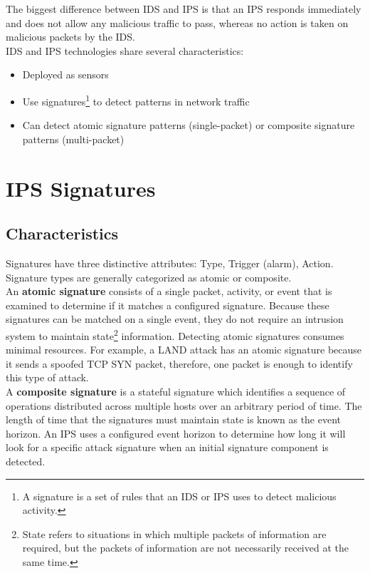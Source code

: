 The biggest difference between IDS and IPS is that an IPS responds immediately and does not allow any malicious traffic to pass, whereas no action is taken on malicious packets by the IDS.\\

IDS and IPS technologies share several characteristics:

\begin{itemize}
\item Deployed as sensors
\item Use signatures\footnote{A signature is a set of rules that an IDS or IPS uses to detect malicious activity.} to detect patterns in network traffic
\item Can detect atomic signature patterns (single-packet) or composite signature patterns (multi-packet)
\end{itemize}

\section{IPS Signatures}

\subsection{Characteristics}

Signatures have three distinctive attributes: Type, Trigger (alarm), Action. Signature types are generally categorized as atomic or composite.\\

An \textbf{atomic signature} consists of a single packet, activity, or event that is examined to determine if it matches a configured signature. Because these signatures can be matched on a single event, they do not require an intrusion system to maintain state\footnote{State refers to situations in which multiple packets of information are required, but the packets of information are not necessarily received at the same time.} information. Detecting atomic signatures consumes minimal resources. For example, a LAND attack has an atomic signature because it sends a spoofed TCP SYN packet, therefore, one packet is enough to identify this type of attack.\\

A \textbf{composite signature} is a stateful signature which identifies a sequence of operations distributed across multiple hosts over an arbitrary period of time. The length of time that the signatures must maintain state is known as the event horizon. An IPS uses a configured event horizon to determine how long it will look for a specific attack signature when an initial signature component is detected.\\

